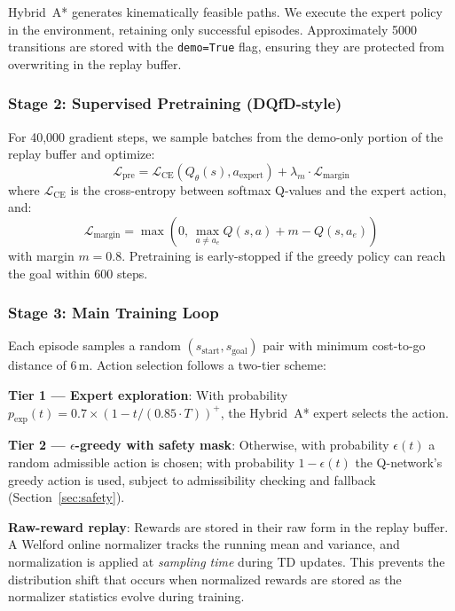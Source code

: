\documentclass[conference]{IEEEtran}
\newcommand{\Qnet}{Q_\theta}
\begin{document}
Hybrid~A* generates kinematically feasible paths.
We execute the expert policy in the environment, retaining only successful episodes.
Approximately 5000 transitions are stored with the \texttt{demo=True} flag, ensuring they are protected from overwriting in the replay buffer.

\subsubsection{Stage 2: Supervised Pretraining (DQfD-style)}

For 40{,}000 gradient steps, we sample batches from the demo-only portion of the replay buffer and optimize:
\begin{equation}
    \mathcal{L}_{\text{pre}} = \mathcal{L}_{\text{CE}}(\Qnet(s), a_{\text{expert}}) + \lambda_m \cdot \mathcal{L}_{\text{margin}}
\end{equation}
where $\mathcal{L}_{\text{CE}}$ is the cross-entropy between softmax Q-values and the expert action, and:
\begin{equation}
    \mathcal{L}_{\text{margin}} = \max\left(0,\, \max_{a \neq a_e} Q(s,a) + m - Q(s, a_e)\right)
\end{equation}
with margin $m = 0.8$.
Pretraining is early-stopped if the greedy policy can reach the goal within 600 steps.

\subsubsection{Stage 3: Main Training Loop}

Each episode samples a random $(s_{\text{start}}, s_{\text{goal}})$ pair with minimum cost-to-go distance of 6\,m.
Action selection follows a two-tier scheme:

\textbf{Tier 1 --- Expert exploration}: With probability $p_{\text{exp}}(t) = 0.7 \times (1 - t / (0.85 \cdot T))^+$, the Hybrid~A* expert selects the action.

\textbf{Tier 2 --- $\epsilon$-greedy with safety mask}: Otherwise, with probability $\epsilon(t)$ a random admissible action is chosen; with probability $1 - \epsilon(t)$ the Q-network's greedy action is used, subject to admissibility checking and fallback (Section~\ref{sec:safety}).

\textbf{Raw-reward replay}: Rewards are stored in their raw form in the replay buffer.
A Welford online normalizer tracks the running mean and variance, and normalization is applied at \emph{sampling time} during TD updates.
This prevents the distribution shift that occurs when normalized rewards are stored as the normalizer statistics evolve during training.
\end{document}
